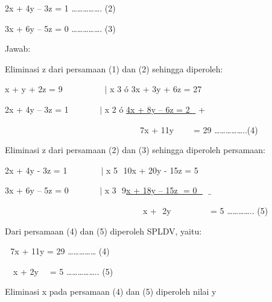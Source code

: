 \documentclass[11pt,fleqn]{book} %
\begin{document}
\begin{myEnumerate}
\begin{itemize}
\begin{myEnumerate}
			2x + 4y – 3z = 1 ……………. (2) \par
			\noindent 
			3x + 6y – 5z = 0 ……………. (3) \par
			\noindent 
			Jawab: \par
			\noindent 
			Eliminasi z dari persamaan (1) dan (2) sehingga diperoleh: \par
			\noindent 
			x + y + 2z = 9 $  $ $  $ $  $ $  $ $  $ $  $ $  $ $  $ $  $ $  $ $  $ $  $ $  $ $  $ $  \vert  $ x 3 $  $ó $  $3x + 3y + 6z = 27 \par
			\noindent 
			2x + 4y – 3z = 1 $  $ $  $ $  $ $  $ $  $ $  $ $  $ $  $ $  $ $  $ $  \vert  $ x 2 $  $ó $  $\underline{4x + 8y – 6z = 2 $  $ $  $} $  $+ \par
			\noindent 
			$  $ $  $ $  $ $  $ $  $ $  $ $  $ $  $ $  $ $  $ $  $ $  $ $  $ $  $ $  $ $  $ $  $ $  $ $  $ $  $ $  $ $  $ $  $ $  $ $  $ $  $ $  $ $  $ $  $ $  $ $  $ $  $ $  $ $  $ $  $ $  $ $  $ $  $ $  $ $  $ $  $ $  $ $  $ $  $ $  $ $  $ $  $ $  $ $  $7x + 11y $  $ $  $ $  $ $  $ $  $ $  $ $  $= 29 ……………..(4) \par
			\vspace{12pt}
			\vspace{12pt}
			\noindent 
			Eliminasi z dari persamaan (2) dan (3) sehingga diperoleh persamaan: \par
			\noindent 
			2x + 4y - 3z = 1 $  $ $  $ $  $ $  $ $  $ $  $ $  $ $  $ $  $ $  $ $  $ $  \vert  $ x 5 $  $ $  $10x + 20y - 15z = 5 \par
			\noindent 
			3x + 6y – 5z = 0 $  $ $  $ $  $ $  $ $  $ $  $ $  $ $  $ $  $ $  $ $  \vert  $ x 3 $  $ $  $9\underline{x + 18y – 15z $  $ $  $= 0 $  $ $  $} $  $ $  \_  $ \par
			\noindent 
			$  $ $  $ $  $ $  $ $  $ $  $ $  $ $  $ $  $ $  $ $  $ $  $ $  $ $  $ $  $ $  $ $  $ $  $ $  $ $  $ $  $ $  $ $  $ $  $ $  $ $  $ $  $ $  $ $  $ $  $ $  $ $  $ $  $ $  $ $  $ $  $ $  $ $  $ $  $ $  $ $  $ $  $ $  $ $  $ $  $ $  $ $  $ $  $ $  $ $  $x + $  $ $  $2y $  $ $  $ $  $ $  $ $  $ $  $ $  $ $  $ $  $ $  $ $  $ $  $ $  $ $  $= 5 ………….. (5) \par
			\noindent 
			Dari persamaan (4) dan (5) diperoleh SPLDV, yaitu: \par
			\noindent 
			$  $ $  $ $  $7x + 11y = 29 …………… (4) \par
			\noindent 
			$  $ $  $ $  $ $  $x + 2y $  $ $  $ $  $ $  $= 5 …………….. (5) \par
			\noindent 
			$  $Eliminasi x pada persamaan (4) dan (5) diperoleh nilai y \par

\end{myEnumerate}
\end{itemize}
\end{myEnumerate}
\end{document}
